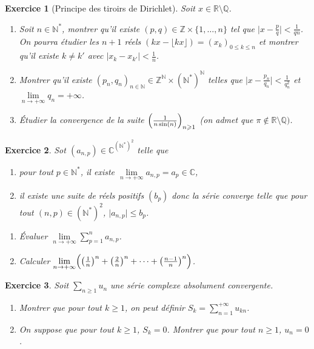 \documentclass[12pt]{article}
\newtheorem{exercise}{Exercice}[section]
\theoremstyle{remark}
\theoremstyle{remark}
\newcommand{\R}{\mathbb{R}}
\newcommand{\C}{\mathbb{C}}
\newcommand{\Q}{\mathbb{Q}}
\newcommand{\N}{\mathbb{N}}
\newcommand{\Z}{\mathbb{Z}}
\begin{document}
\begin{exercise}[Principe des tiroirs de Dirichlet]
	Soit $x\in\R\setminus\Q$.
	\begin{enumerate}
		\item Soit $n\in\N^{*}$, montrer qu'il existe
		$(p,q)\in\Z\times\{1,\dots,n\}$ tel que $\bigl\vert
		x-\frac{p}{q}\bigr\vert<\frac{1}{qn}$. On pourra étudier les $n+1$ réels
		$(kx-\lfloor kx\rfloor)=(x_{k})_{0\leqslant k\leqslant n}$ et montrer
		qu'il existe $k\neq k'$ avec $\vert x_{k}-x_{k'}\vert<\frac{1}{n}$.
		\item Montrer qu'il existe
		$(p_{n},q_{n})_{n\in\N}\in\Z^{\N}\times(\N^{*})^{\N}$ telles que $\bigl\vert
		x-\frac{p_{n}}{q_{n}}\bigr\vert<\frac{1}{q_{n}^{2}}$ et
		$\lim\limits_{n\to+\infty}q_{n}=+\infty$.
		\item Étudier la convergence de la suite
		$\Bigl(\frac{1}{n\sin(n)}\Bigr)_{n\geqslant1}$ (on admet que $\pi\notin\R\setminus\Q)$.
	\end{enumerate}
\end{exercise}

\begin{exercise}
	Sot $(a_{n,p})\in\C^{(\N^{*})^{2}}$ telle que 
	\begin{enumerate}
		\item [(i)] pour tout $p\in\N^{*}$, il existe $\lim\limits_{n\to+\infty}a_{n,p}=a_{p}\in\C$,
		\item [(ii)] il existe une suite de réels positifs $(b_{p})$ donc la
		série converge telle que pour tout $(n,p)\in(\N^{*})^{2}$, $\lvert
		a_{n,p}\rvert\leqslant b_{p}$.	
	\end{enumerate}
	\begin{enumerate}
		\item Évaluer $\lim\limits_{n\to+\infty}\sum_{p=1}^{n}a_{n,p}$.
		\item Calculer $\lim\limits_{n\to+\infty}\Bigl(\bigl(\frac{1}{n}\bigr)^{n}+\bigl(\frac{2}{n}\bigr)^{n}+\dots+\bigl(\frac{n-1}{n}\bigr)^{n}\Bigr)$.
	\end{enumerate}
\end{exercise}

\begin{exercise}
	Soit $\sum_{n\geqslant1}u_{n}$ une série complexe absolument convergente.
	\begin{enumerate}
		\item Montrer que pour tout $k\geqslant1$, on peut définir $S_{k}=\sum_{n=1}^{+\infty}u_{kn}$.
		\item On suppose que pour tout $k\geqslant1$, $S_{k}=0$. Montrer que
		pour tout $n\geqslant1$, $u_{n}=0$.
	\end{enumerate}
\end{exercise}
\end{document}
